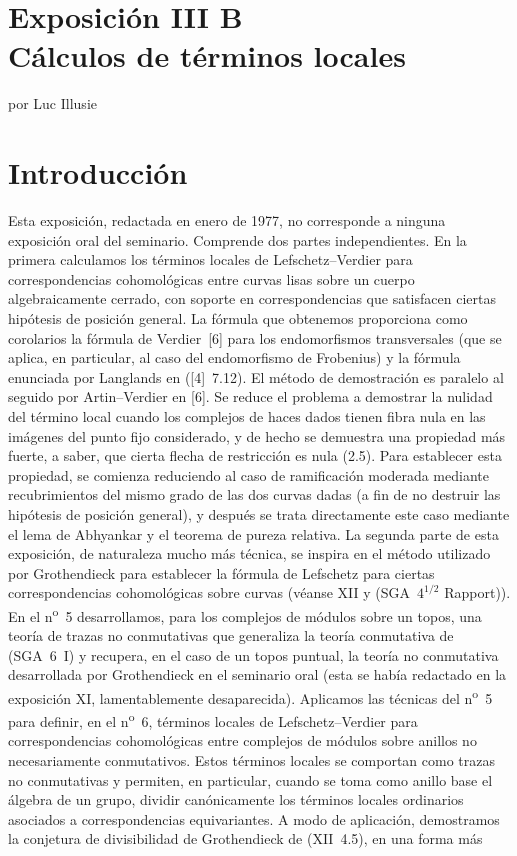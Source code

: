 \section*{Exposición III B\\Cálculos de términos locales}
\begin{center}
por Luc Illusie
\end{center}

\section*{Introducción}

Esta exposición, redactada en enero de 1977, no corresponde a ninguna exposición oral del seminario. Comprende dos partes independientes. En la primera calculamos los términos locales de Lefschetz--Verdier para correspondencias cohomológicas entre curvas lisas sobre un cuerpo algebraicamente cerrado, con soporte en correspondencias que satisfacen ciertas hipótesis de posición general. La fórmula que obtenemos proporciona como corolarios la fórmula de Verdier~[6] para los endomorfismos transversales (que se aplica, en particular, al caso del endomorfismo de Frobenius) y la fórmula enunciada por Langlands en ([4]~7.12). El método de demostración es paralelo al seguido por Artin--Verdier en [6]. Se reduce el problema a demostrar la nulidad del término local cuando los complejos de haces dados tienen fibra nula en las imágenes del punto fijo considerado, y de hecho se demuestra una propiedad más fuerte, a saber, que cierta flecha de restricción es nula (2.5). Para establecer esta propiedad, se comienza reduciendo al caso de ramificación moderada mediante recubrimientos del mismo grado de las dos curvas dadas (a fin de no destruir las hipótesis de posición general), y después se trata directamente este caso mediante el lema de Abhyankar y el teorema de pureza relativa. La segunda parte de esta exposición, de naturaleza mucho más técnica, se inspira en el método utilizado por Grothendieck para establecer la fórmula de Lefschetz para ciertas correspondencias cohomológicas sobre curvas (véanse XII y (SGA~$4^{1/2}$ Rapport)). En el n\textsuperscript{o}~5 desarrollamos, para los complejos de módulos sobre un topos, una teoría de trazas no conmutativas que generaliza la teoría conmutativa de (SGA~6~I) y recupera, en el caso de un topos puntual, la teoría no conmutativa desarrollada por Grothendieck en el seminario oral (esta se había redactado en la exposición XI, lamentablemente desaparecida). Aplicamos las técnicas del n\textsuperscript{o}~5 para definir, en el n\textsuperscript{o}~6, términos locales de Lefschetz--Verdier para correspondencias cohomológicas entre complejos de módulos sobre anillos no necesariamente conmutativos. Estos términos locales se comportan como trazas no conmutativas y permiten, en particular, cuando se toma como anillo base el álgebra de un grupo, dividir canónicamente los términos locales ordinarios asociados a correspondencias equivariantes. A modo de aplicación, demostramos la conjetura de divisibilidad de Grothendieck de (XII~4.5), en una forma más 